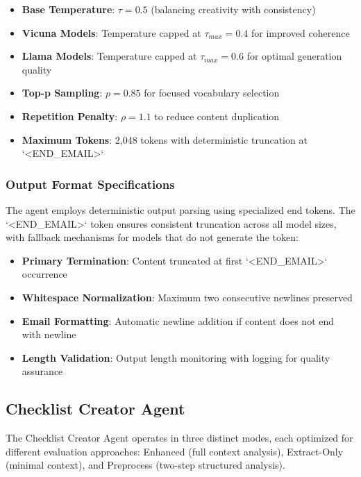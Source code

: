 \begin{itemize}
    \item \textbf{Base Temperature}: $\tau = 0.5$ (balancing creativity with consistency)
    \item \textbf{Vicuna Models}: Temperature capped at $\tau_{max} = 0.4$ for improved coherence
    \item \textbf{Llama Models}: Temperature capped at $\tau_{max} = 0.6$ for optimal generation quality
    \item \textbf{Top-p Sampling}: $p = 0.85$ for focused vocabulary selection
    \item \textbf{Repetition Penalty}: $\rho = 1.1$ to reduce content duplication
    \item \textbf{Maximum Tokens}: 2,048 tokens with deterministic truncation at `<END\_EMAIL>`
\end{itemize}

\subsubsection{Output Format Specifications}

The agent employs deterministic output parsing using specialized end tokens. The `<END\_EMAIL>` token ensures consistent truncation across all model sizes, with fallback mechanisms for models that do not generate the token:

\begin{itemize}
    \item \textbf{Primary Termination}: Content truncated at first `<END\_EMAIL>` occurrence
    \item \textbf{Whitespace Normalization}: Maximum two consecutive newlines preserved
    \item \textbf{Email Formatting}: Automatic newline addition if content does not end with newline
    \item \textbf{Length Validation}: Output length monitoring with logging for quality assurance
\end{itemize}

\subsection{Checklist Creator Agent}
\label{subsec:checklist-creator-prompts}

The Checklist Creator Agent operates in three distinct modes, each optimized for different evaluation approaches: Enhanced (full context analysis), Extract-Only (minimal context), and Preprocess (two-step structured analysis).

